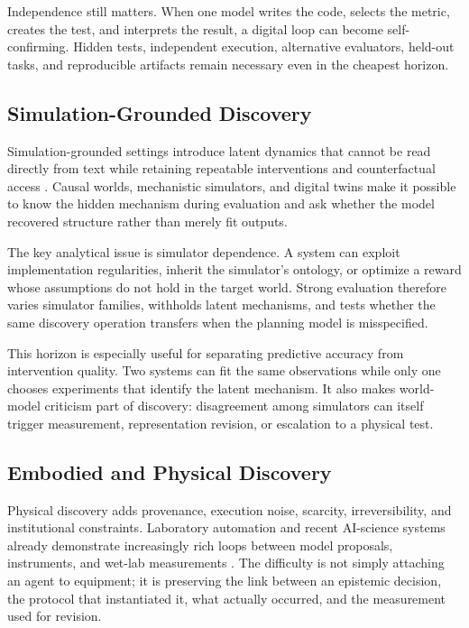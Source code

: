 \documentclass[11pt, a4paper, copyright]{google}
\begin{document}
Independence still matters. When one model writes the code, selects the metric, creates the test, and interprets the result, a digital loop can become self-confirming. Hidden tests, independent execution, alternative evaluators, held-out tasks, and reproducible artifacts remain necessary even in the cheapest horizon.

\subsection{Simulation-Grounded Discovery}
\label{subsec:simulation-grounded-discovery}

Simulation-grounded settings introduce latent dynamics that cannot be read directly from text while retaining repeatable interventions and counterfactual access \citep{hafner2025dreamer,gandhi2025boxinggym}. Causal worlds, mechanistic simulators, and digital twins make it possible to know the hidden mechanism during evaluation and ask whether the model recovered structure rather than merely fit outputs.

The key analytical issue is simulator dependence. A system can exploit implementation regularities, inherit the simulator's ontology, or optimize a reward whose assumptions do not hold in the target world. Strong evaluation therefore varies simulator families, withholds latent mechanisms, and tests whether the same discovery operation transfers when the planning model is misspecified.

This horizon is especially useful for separating predictive accuracy from intervention quality. Two systems can fit the same observations while only one chooses experiments that identify the latent mechanism. It also makes world-model criticism part of discovery: disagreement among simulators can itself trigger measurement, representation revision, or escalation to a physical test.

\subsection{Embodied and Physical Discovery}
\label{subsec:physical-discovery}

Physical discovery adds provenance, execution noise, scarcity, irreversibility, and institutional constraints. Laboratory automation and recent AI-science systems already demonstrate increasingly rich loops between model proposals, instruments, and wet-lab measurements \citep{abolhasani2023selfdriving,boiko2023coscientist,szymanski2023alab,swanson2025virtuallab,gottweis2026coscientist,ghareeb2026robin}. The difficulty is not simply attaching an agent to equipment; it is preserving the link between an epistemic decision, the protocol that instantiated it, what actually occurred, and the measurement used for revision.
\end{document}
